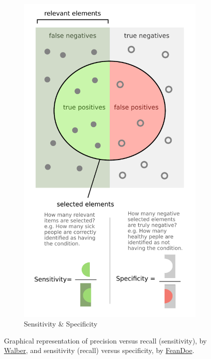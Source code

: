 \begin{figure}
\begin{subfigure}[c]{0.48\textwidth}
  \includegraphics[width=\textwidth]{figures/ml/sensitivity_and_specificity.pdf}
  \caption{Sensitivity \& Specificity}
  \label{fig:graphical_CM_quantities:sensitivity_specificity}
  \end{subfigure}
\caption{
Graphical representation of
precision versus recall (sensitivity), by \href{https://commons.wikimedia.org/wiki/File:Precisionrecall.svg}{Walber},
and
sensitivity (recall) versus specificity, by \href{http://en.wikipedia.org/wiki/File:Sensitivity_and_specificity.svg}{FeanDoe}.
}
\label{fig:graphical_CM_quantities}
\end{figure}

